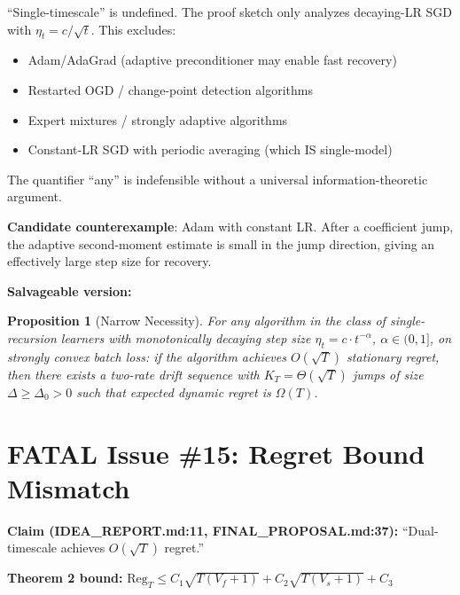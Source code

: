 \documentclass[11pt,a4paper]{article}
\newtheorem{proposition}{Proposition}
\begin{document}
\begin{whywrongbox}
``Single-timescale'' is undefined. The proof sketch only analyzes decaying-LR
SGD with $\eta_t = c/\sqrt{t}$. This excludes:
\begin{itemize}[nosep]
\item Adam/AdaGrad (adaptive preconditioner may enable fast recovery)
\item Restarted OGD / change-point detection algorithms
\item Expert mixtures / strongly adaptive algorithms
\item Constant-LR SGD with periodic averaging (which IS single-model)
\end{itemize}
The quantifier ``any'' is indefensible without a universal information-theoretic
argument.

\textbf{Candidate counterexample}: Adam with constant LR.
After a coefficient jump, the adaptive second-moment estimate is small in the
jump direction, giving an effectively large step size for recovery.
\end{whywrongbox}

\begin{afterbox}
\textbf{Salvageable version:}
\begin{proposition}[Narrow Necessity]
For any algorithm in the class of \emph{single-recursion learners} with
monotonically decaying step size $\eta_t = c \cdot t^{-\alpha}$,
$\alpha \in (0,1]$, on strongly convex batch loss:
if the algorithm achieves $O(\sqrt{T})$ stationary regret,
then there exists a two-rate drift sequence with $K_T = \Theta(\sqrt{T})$
jumps of size $\Delta \geq \Delta_0 > 0$ such that expected dynamic regret
is $\Omega(T)$.
\end{proposition}
\end{afterbox}

\section{FATAL Issue \#15: Regret Bound Mismatch}

\begin{beforebox}
\textbf{Claim (IDEA\_REPORT.md:11, FINAL\_PROPOSAL.md:37):}
``Dual-timescale achieves $O(\sqrt{T})$ regret.''

\textbf{Theorem 2 bound:}
$\mathrm{Reg}_T \leq C_1\sqrt{T(V_f+1)} + C_2\sqrt{T(V_s+1)} + C_3$
\end{beforebox}
\end{document}
